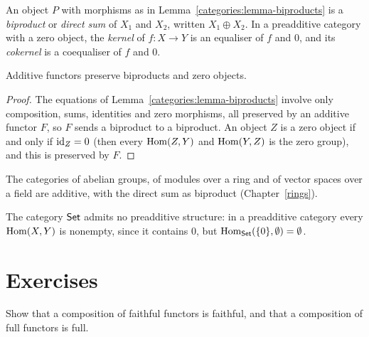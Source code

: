 \begin{definition}\label{categories:definition-biproduct}
An object $P$ with morphisms as in Lemma~\ref{categories:lemma-biproducts} is a
\emph{biproduct} or \emph{direct sum} of $X_1$ and $X_2$, written $X_1 \oplus X_2$.
In a preadditive category with a zero object, the \emph{kernel} of
$f \colon X \to Y$ is an equaliser of $f$ and $0$, and its \emph{cokernel} is a
coequaliser of $f$ and $0$.
\end{definition}

\begin{proposition}\label{categories:proposition-additive-functors-biproducts}
Additive functors preserve biproducts and zero objects.
\end{proposition}

\begin{proof}
The equations of Lemma~\ref{categories:lemma-biproducts} involve only
composition, sums, identities and zero morphisms, all preserved by an additive
functor $F$, so $F$ sends a biproduct to a biproduct. An object $Z$ is a zero
object if and only if $\mathrm{id}_Z = 0$ (then every $\operatorname{Hom}(Z, Y)$ and $\operatorname{Hom}(Y, Z)$ is the zero
group), and this is preserved by $F$.
\end{proof}

\begin{example}\label{categories:example-additive}
The categories of abelian groups, of modules over a ring and of vector spaces
over a field are additive, with the direct sum as biproduct
(Chapter~\ref{rings}).
\end{example}

\begin{counterexample}\label{categories:counterexample-sets-not-preadditive}
The category $\mathsf{Set}$ admits no preadditive structure: in a preadditive category
every $\operatorname{Hom}(X, Y)$ is nonempty, since it contains $0$, but
$\operatorname{Hom}_{\mathsf{Set}}(\{0\}, \emptyset) = \emptyset$.
\end{counterexample}

\section{Exercises}\label{categories:section-exercises}

\begin{exercise}\label{categories:exercise-composition-full-faithful}
Show that a composition of faithful functors is faithful, and that a
composition of full functors is full.
\end{exercise}

